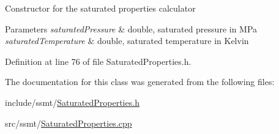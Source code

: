 Constructor for the saturated properties calculator 
\begin{DoxyParams}{Parameters}
{\em saturated\+Pressure} & double, saturated pressure in M\+Pa \\
\hline
{\em saturated\+Temperature} & double, saturated temperature in Kelvin \\
\hline
\end{DoxyParams}


Definition at line 76 of file Saturated\+Properties.\+h.



The documentation for this class was generated from the following files\+:\begin{DoxyCompactItemize}
\item 
include/ssmt/\hyperlink{_saturated_properties_8h}{Saturated\+Properties.\+h}\item 
src/ssmt/\hyperlink{_saturated_properties_8cpp}{Saturated\+Properties.\+cpp}\end{DoxyCompactItemize}
